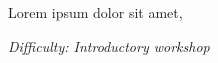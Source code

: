 %
%
%



\newcommand{\workshopTitle}{Workshop n: }

\newcommand{\workshopAuthor}{Joe Bloggs}



	
	
	Lorem ipsum dolor sit amet,
	
	\textit{Difficulty: Introductory workshop}
	
	\setcounter{tocdepth}{1}
	\tableofcontents
	\vspace{12pt}
	

